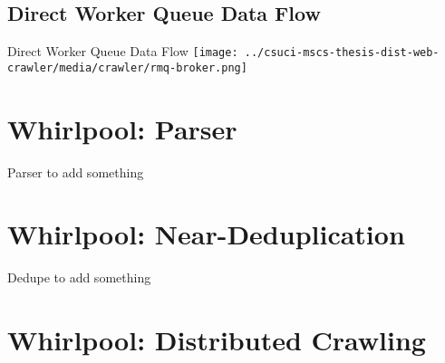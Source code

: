 \documentclass[9pt]{beamer}
\begin{document}

\subsection{Direct Worker Queue Data Flow}
\begin{frame}{Direct Worker Queue Data Flow}
  \centering
  \texttt{[image: ../csuci-mscs-thesis-dist-web-crawler/media/crawler/rmq-broker.png]}
\end{frame}


\section[Parser]{Whirlpool: Parser}
\begin{frame}[plain]
\end{frame}


\begin{frame}{Parser}
  to add something
\end{frame}


\section[Deduplication]{Whirlpool: Near-Deduplication}
\begin{frame}[plain]
\end{frame}


\begin{frame}{Dedupe}
  to add something
\end{frame}


\section[Dist. Crawling]{Whirlpool: Distributed Crawling}
\begin{frame}[plain]
\end{frame}

\end{document}
